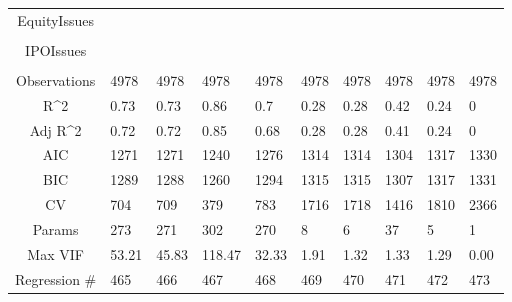 \documentclass{article}
\begin{document}
\begin{table}[H]
\begin{tabular}{|clllllllll|}
  EquityIssues &  &  &  &  &  &  &  &  &  \\ 
   &  &  &  &  &  &  &  &  &  \\ 
  IPOIssues &  &  &  &  &  &  &  &  &  \\ 
   &  &  &  &  &  &  &  &  &  \\ 
  \hline 
 Observations & 4978 & 4978 & 4978 & 4978 & 4978 & 4978 & 4978 & 4978 & 4978 \\ 
  R^2 & 0.73 & 0.73 & 0.86 & 0.7 & 0.28 & 0.28 & 0.42 & 0.24 & 0 \\ 
  Adj R^2 & 0.72 & 0.72 & 0.85 & 0.68 & 0.28 & 0.28 & 0.41 & 0.24 & 0 \\ 
  AIC & 1271 & 1271 & 1240 & 1276 & 1314 & 1314 & 1304 & 1317 & 1330 \\ 
  BIC & 1289 & 1288 & 1260 & 1294 & 1315 & 1315 & 1307 & 1317 & 1331 \\ 
  CV & 704 & 709 & 379 & 783 & 1716 & 1718 & 1416 & 1810 & 2366 \\ 
  Params & 273 & 271 & 302 & 270 & 8 & 6 & 37 & 5 & 1 \\ 
  Max VIF & 53.21 & 45.83 & 118.47 & 32.33 & 1.91 & 1.32 & 1.33 & 1.29 & 0.00 \\ 
  Regression \# & 465 & 466 & 467 & 468 & 469 & 470 & 471 & 472 & 473 \\ 
   \hline
\end{tabular}
 
\end{table}
\end{document}
